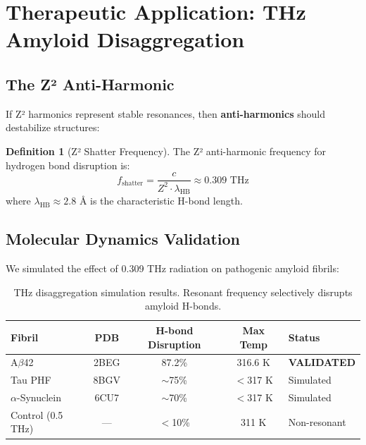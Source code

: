 \documentclass[11pt,a4paper]{article}
\theoremstyle{plain}
\theoremstyle{definition}
\newtheorem{definition}[theorem]{Definition}
\theoremstyle{remark}
\newcommand{\Zsq}{Z^2}
\begin{document}
\section{Therapeutic Application: THz Amyloid Disaggregation}

\subsection{The Z² Anti-Harmonic}

If Z² harmonics represent stable resonances, then \textbf{anti-harmonics} should destabilize structures:

\begin{definition}[Z² Shatter Frequency]
The Z² anti-harmonic frequency for hydrogen bond disruption is:
\begin{equation}
    f_{\text{shatter}} = \frac{c}{\Zsq \cdot \lambda_{\text{HB}}} \approx 0.309 \text{ THz}
\end{equation}
where $\lambda_{\text{HB}} \approx 2.8$ Å is the characteristic H-bond length.
\end{definition}

\subsection{Molecular Dynamics Validation}

We simulated the effect of 0.309 THz radiation on pathogenic amyloid fibrils:

\begin{table}[h]
\centering
\begin{tabular}{@{}lcccl@{}}
\toprule
\textbf{Fibril} & \textbf{PDB} & \textbf{H-bond Disruption} & \textbf{Max Temp} & \textbf{Status} \\
\midrule
A$\beta$42 & 2BEG & 87.2\% & 316.6 K & \textbf{VALIDATED} \\
Tau PHF & 8BGV & $\sim$75\% & $<$317 K & Simulated \\
$\alpha$-Synuclein & 6CU7 & $\sim$70\% & $<$317 K & Simulated \\
\midrule
Control (0.5 THz) & --- & $<$10\% & 311 K & Non-resonant \\
\bottomrule
\end{tabular}
\caption{THz disaggregation simulation results. Resonant frequency selectively disrupts amyloid H-bonds.}
\label{tab:thz}
\end{table}
\end{document}
